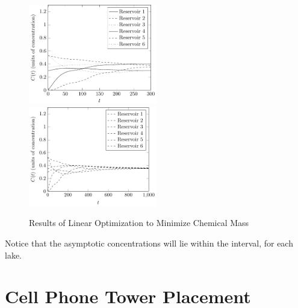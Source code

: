 \documentclass{article}
\begin{document}
\begin{figure}[h!]
\includegraphics[width=0.5\textwidth]{figures/part-3.pdf}
\includegraphics[width=0.5\textwidth]{figures/part-3-extended.pdf}
\caption{Results of Linear Optimization to Minimize Chemical Mass}
\label{fig:part-3}
\end{figure}

Notice that the asymptotic concentrations will lie within the interval, for each lake.

\section{Cell Phone Tower Placement}
\end{document}
